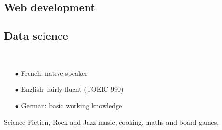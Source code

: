 \documentclass{cv}
\begin{document}
\noindent\begin{minipage}[t]{0.6\textwidth}

\subsection*{Web development}

         

\end{minipage}\hspace{.5cm}
\begin{minipage}[t]{0.3\textwidth}

\subsection*{Data science}

   

\end{minipage}

\paragraph{}\,

\noindent\begin{minipage}[t]{0.6\textwidth}


\begin{itemize}
\setlength\itemsep{0pt}
\item[$\bullet$] French: native speaker
\item[$\bullet$] English: fairly fluent (TOEIC 990)
\item[$\bullet$] German: basic working knowledge
\end{itemize}

\end{minipage}\hspace{.5cm}
\begin{minipage}[t]{0.3\textwidth}


Science Fiction, Rock and Jazz music, cooking, maths and board games.

\end{minipage}
\end{document}
